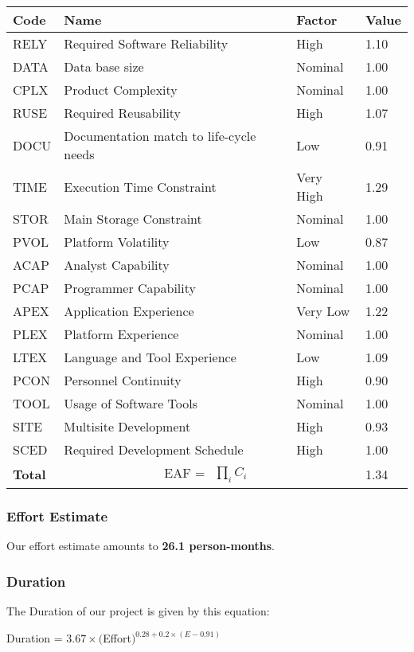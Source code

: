 	\begin{tabular}{|l|l|l|l|}
	\hline
	\textbf{Code} & \textbf{Name} & \textbf{Factor} & \textbf{Value}\\
	\hline
	RELY & Required Software Reliability			& High 	&		1.10\\
	\hline
	DATA & Data base size 							& Nominal &		1.00\\
	\hline
	CPLX & Product Complexity 						& Nominal &		1.00\\
	\hline
	RUSE& Required Reusability 						& High &		1.07\\
	\hline
	DOCU & Documentation match to life-cycle needs 	& Low & 		0.91\\
	\hline
	TIME & Execution Time Constraint 				& Very High &	1.29\\
	\hline
	STOR & Main Storage Constraint 					& Nominal &		1.00\\
	\hline
	PVOL & Platform Volatility 						& Low & 		0.87\\
	\hline
	ACAP & Analyst Capability 						& Nominal & 	1.00\\
	\hline
	PCAP & Programmer Capability 					& Nominal &		1.00\\
	\hline
	APEX & Application Experience 					& Very Low &	1.22\\
	\hline
	PLEX & Platform Experience 						& Nominal &		1.00\\
	\hline
	LTEX & Language and Tool Experience 			& Low & 		1.09\\
	\hline
	PCON & Personnel Continuity 					& High & 		0.90\\
	\hline
	TOOL & Usage of Software Tools 					& Nominal &		1.00\\
	\hline
	SITE & Multisite Development 					& High &		0.93\\
	\hline
	SCED & Required Development Schedule 			& High &		1.00\\
	\hline
	\textbf{Total} & \multicolumn{2}{|c|}{EAF = $\begin{matrix} \prod_{i} C_i \end{matrix}$} & 1.34 \\
	\hline
	\end{tabular}
	
	
\subsubsection{Effort Estimate}
	Our effort estimate amounts to \textbf{26.1 person-months}.  
	
\subsubsection{Duration}
	The Duration of our project is given by this equation:\\
	\begin{center}
	
	Duration = $ 3.67 \times  ($Effort$)^{0.28 + 0.2 \times (E-0.91)} $ \\
	
	\end{center}
	

